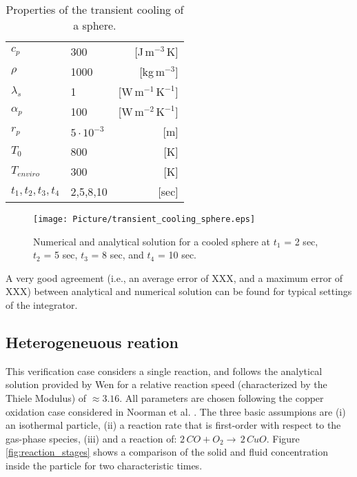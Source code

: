 \documentclass{particles2015}
\begin{document}
\begin{table}[h]
  \centering 
  \caption{Properties of the transient cooling of a sphere.}
   \begin{tabular}{llr}
      \hline 
        $c_p$                   &300       & [J$\,\text{m}^{-3}\,$K]\\   
       	$\rho$					&1000	   & [kg$\, \text{m}^{-3}$]\\
        $\lambda_s$				&1		   & [W$\, \text{m}^{-1} \,\text{K}^{-1}$]\\
        $\alpha_p$ 				&100	   & [W$\, \text{m}^{-2} \,\text{K}^{-1}$]\\
        $r_p$					&$5\cdot 10^{-3}$ & [m]\\
        $ T_0$					& 800& [K] \\
        $T_{enviro}$			& 300& [K]\\
        $t_1,t_2,t_3,t_4$ 		& 2,5,8,10 & [sec]\\
      \hline      
       \end{tabular}
   \setlength{\belowcaptionskip}{12pt}
   \label{tab:properties_cooling_sphere}
\end{table}


\begin{figure}[h!]
   \centering
   \texttt{[image: Picture/transient\_cooling\_sphere.eps]}
   \caption{Numerical and analytical solution for a  cooled sphere at $t_1$ = 2 sec, $t_2$ = 5 sec, $t_3$ = 8 sec, and $t_4$ = 10 sec.}
   \label{fig:Cooling_sphere}
\end{figure}

A very good agreement (i.e., an average error of XXX, and a maximum error of XXX) between analytical and numerical solution can be found for typical settings of the integrator.


\subsection{Heterogeneuous reation}
\label{sec:heterogeneuous_reaction}

This verification case considers a single reaction, and follows the analytical solution provided by Wen \cite{Wen} for a relative reaction speed (characterized by the Thiele Modulus) of $\approx 3.16$. All parameters are chosen following the copper oxidation case considered in Noorman et al. \cite{Noorman2011}. The three basic assumpions are (i) an isothermal particle, (ii) a reaction rate that is first-order with respect to the gas-phase species, (iii) and a reaction of: $2 \, CO + O_2 \rightarrow \, 2\, CuO$. Figure \ref{fig:reaction_stages} shows a comparison of the solid and fluid concentration inside the particle for two characteristic times.
\end{document}
